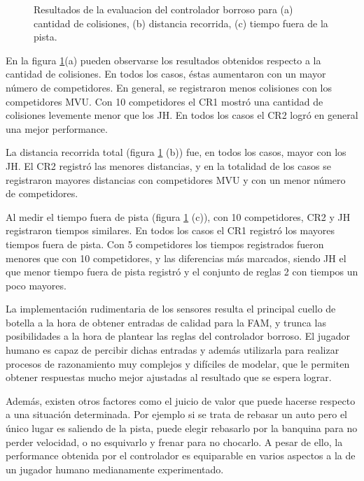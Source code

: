 \documentclass[conference,spanish,a4paper,10pt,oneside,final]{tfmpd}
\begin{document}
\begin{figure}[tbhp]
\caption{Resultados de la evaluacion del controlador borroso para (a) cantidad de colisiones,
 (b) distancia recorrida,  (c) tiempo fuera de la pista.}
\label{evaluacion}
\end{figure}

En la figura \ref{evaluacion}(a) pueden observarse los resultados obtenidos respecto a la cantidad de colisiones. 
En todos los casos, éstas aumentaron con un mayor número de competidores. En general, se registraron menos colisiones con los
competidores MVU. Con 10 competidores el CR1 mostró una cantidad de colisiones levemente menor que los JH.
En todos los casos el CR2 logró en general una mejor performance.

La distancia recorrida total (figura \ref{evaluacion} (b)) fue, en todos los casos, mayor con los JH.
El CR2 registró las menores distancias, y en la totalidad de los casos se registraron mayores distancias con competidores
MVU y con un menor número de competidores.

Al medir el tiempo fuera de pista (figura \ref{evaluacion} (c)),
con 10 competidores, CR2 y JH registraron tiempos similares. En todos los
casos el CR1 registró los mayores tiempos fuera de pista. Con 5 competidores los tiempos registrados fueron
menores que con 10 competidores, y las diferencias más marcados, siendo JH el que menor tiempo fuera de pista registró
y el conjunto de reglas 2 con tiempos un poco mayores.

La implementación rudimentaria de los sensores resulta el principal cuello de botella a la hora de obtener
entradas de calidad para la FAM, y trunca las posibilidades a la hora de plantear las reglas del controlador borroso.
El jugador humano es capaz de percibir dichas entradas y además utilizarla para realizar procesos
de razonamiento muy complejos y difíciles de modelar, que le permiten obtener respuestas mucho mejor ajustadas
al resultado que se espera lograr.

Además, existen otros factores como el juicio de valor que puede hacerse
respecto a una situación determinada. Por ejemplo si se trata de rebasar
un auto pero el único lugar es saliendo de la pista, puede elegir
rebasarlo por la banquina para no perder velocidad, o no esquivarlo y frenar para no chocarlo.
A pesar de ello, la performance obtenida por el controlador es equiparable en varios aspectos a la de un jugador humano
medianamente experimentado. 
\end{document}
